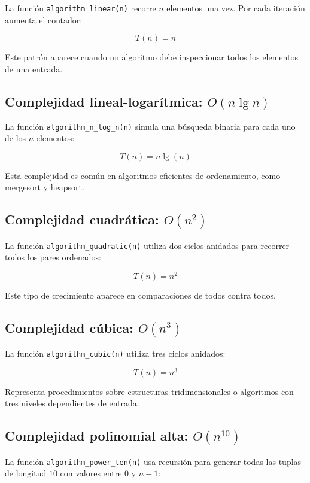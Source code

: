 \documentclass[12pt,letterpaper]{article}
\begin{document}
La función \texttt{algorithm\_linear(n)} recorre $n$ elementos una vez. Por cada iteración aumenta el contador:

\[
T(n) = n
\]

Este patrón aparece cuando un algoritmo debe inspeccionar todos los elementos de una entrada.

\subsection{Complejidad lineal-logarítmica: \texorpdfstring{$O(n\lg n)$}{O(n lg n)}}

La función \texttt{algorithm\_n\_log\_n(n)} simula una búsqueda binaria para cada uno de los $n$ elementos:

\[
T(n) = n\lg(n)
\]

Esta complejidad es común en algoritmos eficientes de ordenamiento, como mergesort y heapsort.

\subsection{Complejidad cuadrática: \texorpdfstring{$O(n^2)$}{O(n2)}}

La función \texttt{algorithm\_quadratic(n)} utiliza dos ciclos anidados para recorrer todos los pares ordenados:

\[
T(n) = n^2
\]

Este tipo de crecimiento aparece en comparaciones de todos contra todos.

\subsection{Complejidad cúbica: \texorpdfstring{$O(n^3)$}{O(n3)}}

La función \texttt{algorithm\_cubic(n)} utiliza tres ciclos anidados:

\[
T(n) = n^3
\]

Representa procedimientos sobre estructuras tridimensionales o algoritmos con tres niveles dependientes de entrada.

\subsection{Complejidad polinomial alta: \texorpdfstring{$O(n^{10})$}{O(n10)}}

La función \texttt{algorithm\_power\_ten(n)} usa recursión para generar todas las tuplas de longitud $10$ con valores entre $0$ y $n-1$:
\end{document}
